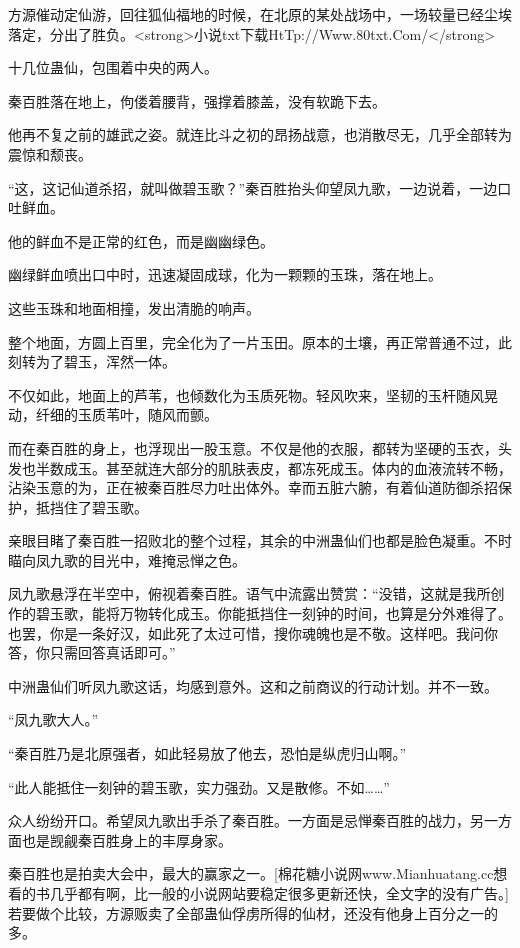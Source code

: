 
\begin{this_body}

方源催动定仙游，回往狐仙福地的时候，在北原的某处战场中，一场较量已经尘埃落定，分出了胜负。<strong>小说txt下载HtTp://Www.80txt.Com/</strong>

十几位蛊仙，包围着中央的两人。

秦百胜落在地上，佝偻着腰背，强撑着膝盖，没有软跪下去。

他再不复之前的雄武之姿。就连比斗之初的昂扬战意，也消散尽无，几乎全部转为震惊和颓丧。

“这，这记仙道杀招，就叫做碧玉歌？”秦百胜抬头仰望凤九歌，一边说着，一边口吐鲜血。

他的鲜血不是正常的红色，而是幽幽绿色。

幽绿鲜血喷出口中时，迅速凝固成球，化为一颗颗的玉珠，落在地上。

这些玉珠和地面相撞，发出清脆的响声。

整个地面，方圆上百里，完全化为了一片玉田。原本的土壤，再正常普通不过，此刻转为了碧玉，浑然一体。

不仅如此，地面上的芦苇，也倾数化为玉质死物。轻风吹来，坚韧的玉杆随风晃动，纤细的玉质苇叶，随风而颤。

而在秦百胜的身上，也浮现出一股玉意。不仅是他的衣服，都转为坚硬的玉衣，头发也半数成玉。甚至就连大部分的肌肤表皮，都冻死成玉。体内的血液流转不畅，沾染玉意的为，正在被秦百胜尽力吐出体外。幸而五脏六腑，有着仙道防御杀招保护，抵挡住了碧玉歌。

亲眼目睹了秦百胜一招败北的整个过程，其余的中洲蛊仙们也都是脸色凝重。不时瞄向凤九歌的目光中，难掩忌惮之色。

凤九歌悬浮在半空中，俯视着秦百胜。语气中流露出赞赏：“没错，这就是我所创作的碧玉歌，能将万物转化成玉。你能抵挡住一刻钟的时间，也算是分外难得了。也罢，你是一条好汉，如此死了太过可惜，搜你魂魄也是不敬。这样吧。我问你答，你只需回答真话即可。”

中洲蛊仙们听凤九歌这话，均感到意外。这和之前商议的行动计划。并不一致。

“凤九歌大人。”

“秦百胜乃是北原强者，如此轻易放了他去，恐怕是纵虎归山啊。”

“此人能抵住一刻钟的碧玉歌，实力强劲。又是散修。不如……”

众人纷纷开口。希望凤九歌出手杀了秦百胜。一方面是忌惮秦百胜的战力，另一方面也是觊觎秦百胜身上的丰厚身家。

秦百胜也是拍卖大会中，最大的赢家之一。[棉花糖小说网www.Mianhuatang.cc想看的书几乎都有啊，比一般的小说网站要稳定很多更新还快，全文字的没有广告。]若要做个比较，方源贩卖了全部蛊仙俘虏所得的仙材，还没有他身上百分之一的多。


\end{this_body}
